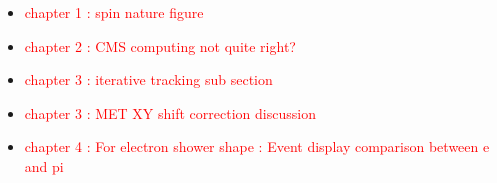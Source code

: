 \begin{itemize}
\item 
\textcolor{red}{chapter 1 : spin nature figure} 

\item 
\textcolor{red}{chapter 2 : CMS computing not quite right?} 

\item 
\textcolor{red}{chapter 3 : iterative tracking sub section} 

\item 
\textcolor{red}{chapter 3 : MET XY shift correction discussion} 

\item 
\textcolor{red}{chapter 4 : For electron shower shape : Event display comparison between e and pi} 

\end{itemize}
